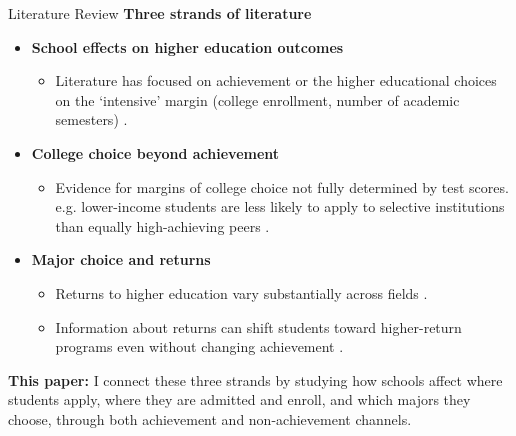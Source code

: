 \documentclass[notes,11pt, aspectratio=169]{beamer}
\let\oldparencite\parencite
\renewcommand{\parencite}[2][]{%
  \footnotesize {\tiny \oldparencite[#1]{#2}} \normalsize %
}
\begin{document}
\begin{frame}{Literature Review}
\textbf{Three strands of literature}

\begin{itemize}
    \item \textbf{School effects on higher education outcomes}
    \begin{itemize}
        \item Literature has focused on achievement or the higher educational choices on the `intensive' margin (college enrollment, number of academic semesters) \parencite{chetty_measuring_2014, angrist_stand_2016, dobbie_medium-term_2015, abdulkadiroglu_elite_2014, abdulkadiroglu_parents_2020}.
    \end{itemize}

    \item \textbf{College choice beyond achievement}
    \begin{itemize}
        \item Evidence for margins of college choice  not fully determined by test scores. e.g. lower-income students are less likely to apply to selective institutions than equally high-achieving peers \parencite{dynarski_closing_2021, chetty_diversifying_2025 , hoxby_what_2015}.
    \end{itemize}

    \item \textbf{Major choice and returns}
    \begin{itemize}
        \item Returns to higher education vary substantially across fields \parencite{kirkeboen_field_2016}.
        \item Information about returns can shift students toward higher-return programs even without changing achievement \parencite{hastings_informed_2016}.
    \end{itemize}
\end{itemize}

\vspace{0.4em}
\textbf{This paper:} I connect these three strands by studying how schools affect where students apply, where they are admitted and enroll, and which majors they choose, through both achievement and non-achievement channels.
    
\end{frame}

\end{document}

